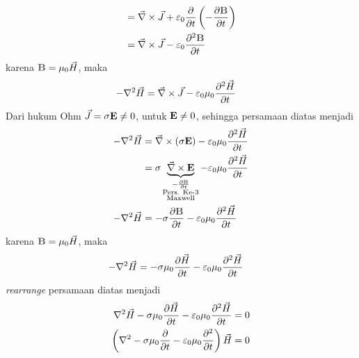 \begin{itemize}[leftmargin=*]
\begin{align*}
        &=\vnabla \times \vJ + \epsilon_0\frac{\partial}{\partial t}\left(-\frac{\partial\vB}{\partial t}\right)\\
        &=\vnabla \times \vJ - \epsilon_0\frac{\partial^2\vB}{\partial t}
    \end{align*}
    karena $\vB=\mu_0 \vH$, maka
    \begin{align*}
        -\nabla^2\vec{H}&=\vec{\nabla} \times \vec{J} - \varepsilon_0\mu_0\frac{\partial^2\vec{H}}{\partial t}
    \end{align*}
    Dari hukum Ohm $\vJ=\sigma \vE \neq 0$, untuk $\vE\neq 0$, sehingga persamaan diatas menjadi
    \begin{align*}
        -\nabla^2\vH&=\vnabla \times (\sigma\vE) - \epsilon_0\mu_0\frac{\partial^2\vH}{\partial t}\\
        &=\sigma \underbrace{\vnabla \times \vE}_{\substack{-\frac{\partial \vB}{\partial t} \\ \text{Pers. Ke-3} \\\text{Maxwell}}} - \epsilon_0\mu_0\frac{\partial^2\vH}{\partial t}\\
        -\nabla^2\vH&=-\sigma \frac{\partial \vB}{\partial t} - \epsilon_0\mu_0\frac{\partial^2\vH}{\partial t}
    \end{align*}
    karena $\vB=\mu_0 \vH$, maka
    \begin{align*}
        -\nabla^2\vec{H}&=-\sigma\mu_0 \frac{\partial \vec{H}}{\partial t} - \varepsilon_0\mu_0\frac{\partial^2\vec{H}}{\partial t}
    \end{align*}
    \textit{rearrange} persamaan diatas menjadi
    \begin{align*}
        \nabla^2\vec{H}-\sigma\mu_0 \frac{\partial \vec{H}}{\partial t} - \varepsilon_0\mu_0\frac{\partial^2\vec{H}}{\partial t}&=0\\
        \left(\nabla^2-\sigma\mu_0 \frac{\partial}{\partial t} - \varepsilon_0\mu_0\frac{\partial^2}{\partial t}\right)\vec{H}&=0\\
    \end{align*}
\end{itemize}